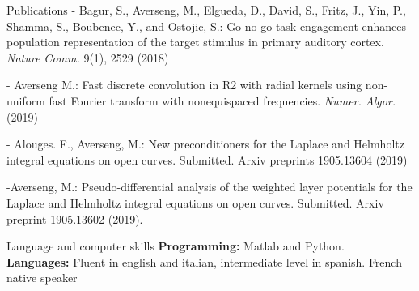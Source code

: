 \documentclass{resume} %
\begin{document}
\begin{rSection}{Publications}
- Bagur, S., Averseng, M., Elgueda, D., David, S., Fritz, J., Yin, P., Shamma, S., Boubenec, Y., and Ostojic, S.: Go no-go task engagement enhances population representation of the target stimulus in primary auditory cortex. {\em Nature Comm.} 9(1), 2529 (2018)

- Averseng M.: Fast discrete convolution in R2
with radial kernels using non-uniform fast Fourier transform with nonequispaced frequencies. {\em Numer. Algor.} (2019)

- Alouges. F., Averseng, M.: New preconditioners for the Laplace and Helmholtz integral equations on open curves. Submitted. Arxiv preprints 1905.13604 (2019)

-Averseng, M.: Pseudo-differential analysis of the weighted layer potentials for the Laplace and Helmholtz integral equations on open curves. Submitted. Arxiv preprint 1905.13602 (2019).
\end{rSection}


\begin{rSection}{Language and computer skills}
{\bf Programming:}  {Matlab and Python.} \\
{\bf Languages:}  {Fluent in english and italian, intermediate level in spanish. French native speaker}
\end{rSection}
\end{document}
